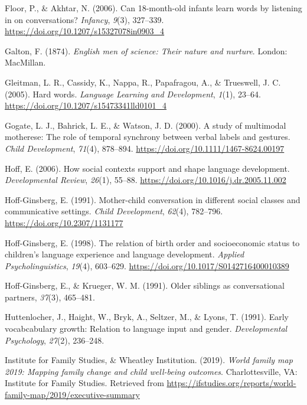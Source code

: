 \documentclass[man,floatsintext]{apa6}
\begin{document}
\leavevmode\hypertarget{ref-floor_can_2006}{}%
Floor, P., \& Akhtar, N. (2006). Can 18-month-old infants learn words by listening in on conversations? \emph{Infancy}, \emph{9}(3), 327--339. \url{https://doi.org/10.1207/s15327078in0903_4}

\leavevmode\hypertarget{ref-galton_english_1874}{}%
Galton, F. (1874). \emph{English men of science: Their nature and nurture}. London: MacMillan.

\leavevmode\hypertarget{ref-gleitman_hard_2005}{}%
Gleitman, L. R., Cassidy, K., Nappa, R., Papafragou, A., \& Trueswell, J. C. (2005). Hard words. \emph{Language Learning and Development}, \emph{1}(1), 23--64. \url{https://doi.org/10.1207/s15473341lld0101_4}

\leavevmode\hypertarget{ref-gogate_study_2000}{}%
Gogate, L. J., Bahrick, L. E., \& Watson, J. D. (2000). A study of multimodal motherese: The role of temporal synchrony between verbal labels and gestures. \emph{Child Development}, \emph{71}(4), 878--894. \url{https://doi.org/10.1111/1467-8624.00197}

\leavevmode\hypertarget{ref-hoff_how_2006}{}%
Hoff, E. (2006). How social contexts support and shape language development. \emph{Developmental Review}, \emph{26}(1), 55--88. \url{https://doi.org/10.1016/j.dr.2005.11.002}

\leavevmode\hypertarget{ref-hoff-ginsberg_mother-child_1991}{}%
Hoff-Ginsberg, E. (1991). Mother-child conversation in different social classes and communicative settings. \emph{Child Development}, \emph{62}(4), 782--796. \url{https://doi.org/10.2307/1131177}

\leavevmode\hypertarget{ref-hoff-ginsberg_relation_1998}{}%
Hoff-Ginsberg, E. (1998). The relation of birth order and socioeconomic status to children's language experience and language development. \emph{Applied Psycholinguistics}, \emph{19}(4), 603--629. \url{https://doi.org/10.1017/S0142716400010389}

\leavevmode\hypertarget{ref-hoff-ginsberg_older_1991}{}%
Hoff-Ginsberg, E., \& Krueger, W. M. (1991). Older siblings as conversational partners, \emph{37}(3), 465--481.

\leavevmode\hypertarget{ref-huttenlocher_early_1991}{}%
Huttenlocher, J., Haight, W., Bryk, A., Seltzer, M., \& Lyons, T. (1991). Early vocabcabulary growth: Relation to language input and gender. \emph{Developmental Psychology}, \emph{27}(2), 236--248.

\leavevmode\hypertarget{ref-institute_for_family_studies_world_2019}{}%
Institute for Family Studies, \& Wheatley Institution. (2019). \emph{World family map 2019: Mapping family change and child well-being outcomes}. Charlottesville, VA: Institute for Family Studies. Retrieved from \url{https://ifstudies.org/reports/world-family-map/2019/executive-summary}
\end{document}
